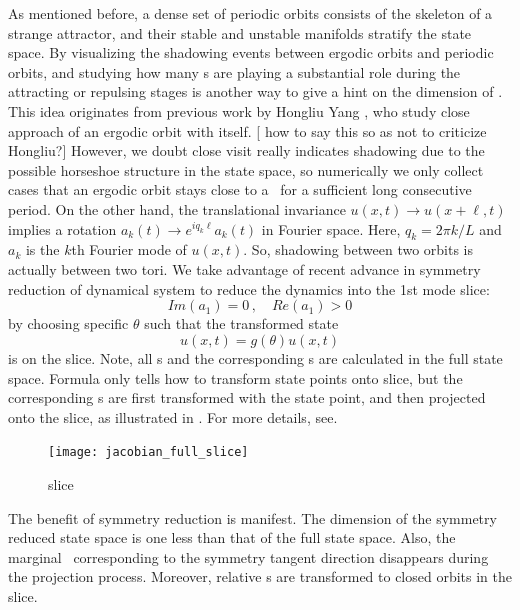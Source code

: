 \documentclass[prl,aps,preprint,showpacs]{revtex4-1} %
\begin{document}
As mentioned before, a dense set of periodic orbits consists of
the skeleton of a strange attractor, and their stable and unstable
manifolds stratify the state space. By visualizing the shadowing
events between ergodic orbits and periodic orbits, and studying
how many \Fv s are playing a substantial role during the attracting
or repulsing stages is another way to give a hint on the dimension
of \inm. This idea originates from previous work by
Hongliu Yang \etc{}, who
study close approach of an ergodic orbit with itself.
[{\color{blue} how to say this so as not to criticize Hongliu?}]
However,
we doubt close visit really indicates shadowing due to the possible
horseshoe structure in the state space, so numerically
we only collect cases that an ergodic orbit stays close to a \po\
for a sufficient long consecutive period. On the other hand, the
translational invariance $u(x,t) \to u(x+\ell,t)$ implies a rotation
$a_k(t) \to e^{iq_k \ell}a_k(t)$ in Fourier space. Here,
$q_k = 2\pi k/L$ and $a_k$ is the $k$th Fourier mode of $u(x,t)$.
So, shadowing between two orbits is actually between
two tori. We take advantage of recent advance in symmetry reduction
of dynamical system to reduce the dynamics into
the 1st mode slice:
\begin{equation}
  \label{eq:slice}
  Im(a_1) = 0 \,, \quad Re(a_1) > 0
\end{equation}
by choosing specific $\theta$ such that the
transformed state
\begin{equation}
  \label{eq:reduceSym}
  \hat{u}(x,t) = g(\theta)u(x,t)
\end{equation}
is on the slice.
Note, all \po s and the corresponding \Fv s are calculated in the
full state space. Formula \refeq{eq:reduceSym} only tells how to
transform state points
onto slice, but the corresponding \Fv s are first transformed with
the state point, and then projected onto the slice, as
illustrated in .
For more details, see.
\begin{figure}[h]
  \centering
  \texttt{[image: jacobian\_full\_slice]}
  \caption{slice}
  \label{fig:slice}
\end{figure}
The benefit of symmetry reduction is manifest.
The dimension of the symmetry reduced state space is one less than that
of the full state space. Also, the marginal \Fv\ corresponding to
the symmetry tangent direction disappears during the projection process.
Moreover, relative \po s are transformed to closed orbits in the slice.
\end{document}

